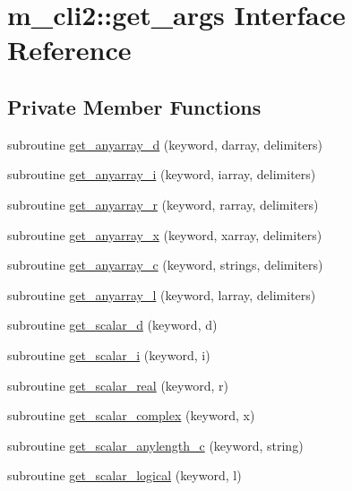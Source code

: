 \hypertarget{interfacem__cli2_1_1get__args}{}\section{m\+\_\+cli2\+:\+:get\+\_\+args Interface Reference}
\label{interfacem__cli2_1_1get__args}
\subsection*{Private Member Functions}
\begin{DoxyCompactItemize}
\item 
subroutine \mbox{\hyperlink{interfacem__cli2_1_1get__args_ac1595f7435cd331533eade965bb371dc}{get\+\_\+anyarray\+\_\+d}} (keyword, darray, delimiters)
\item 
subroutine \mbox{\hyperlink{interfacem__cli2_1_1get__args_a958091825d17ff491815f01f634933fa}{get\+\_\+anyarray\+\_\+i}} (keyword, iarray, delimiters)
\item 
subroutine \mbox{\hyperlink{interfacem__cli2_1_1get__args_a1cf569a2a24fec1774e7c73c40598661}{get\+\_\+anyarray\+\_\+r}} (keyword, rarray, delimiters)
\item 
subroutine \mbox{\hyperlink{interfacem__cli2_1_1get__args_a8581641c551aa6fe4c0592fb63de11fe}{get\+\_\+anyarray\+\_\+x}} (keyword, xarray, delimiters)
\item 
subroutine \mbox{\hyperlink{interfacem__cli2_1_1get__args_aa60d116ceb254630c102ef174471e375}{get\+\_\+anyarray\+\_\+c}} (keyword, strings, delimiters)
\item 
subroutine \mbox{\hyperlink{interfacem__cli2_1_1get__args_a3ff3d0bd398e40fd207c2aa09b5bf8a9}{get\+\_\+anyarray\+\_\+l}} (keyword, larray, delimiters)
\item 
subroutine \mbox{\hyperlink{interfacem__cli2_1_1get__args_a118d13d610c68afb422c2dbefa07c6f8}{get\+\_\+scalar\+\_\+d}} (keyword, d)
\item 
subroutine \mbox{\hyperlink{interfacem__cli2_1_1get__args_a40f19581d7e5bcf7450391e2ac2b26a3}{get\+\_\+scalar\+\_\+i}} (keyword, i)
\item 
subroutine \mbox{\hyperlink{interfacem__cli2_1_1get__args_aa6f39c9132687c0396d3b054bc5e47f6}{get\+\_\+scalar\+\_\+real}} (keyword, r)
\item 
subroutine \mbox{\hyperlink{interfacem__cli2_1_1get__args_a6c9a2315891b94aa062c34c82082a9da}{get\+\_\+scalar\+\_\+complex}} (keyword, x)
\item 
subroutine \mbox{\hyperlink{interfacem__cli2_1_1get__args_a42c3b7050881edf76682b7b0058b868a}{get\+\_\+scalar\+\_\+anylength\+\_\+c}} (keyword, string)
\item 
subroutine \mbox{\hyperlink{interfacem__cli2_1_1get__args_a067f9a7dd7edb825afb728f069b3233e}{get\+\_\+scalar\+\_\+logical}} (keyword, l)
\end{DoxyCompactItemize}


